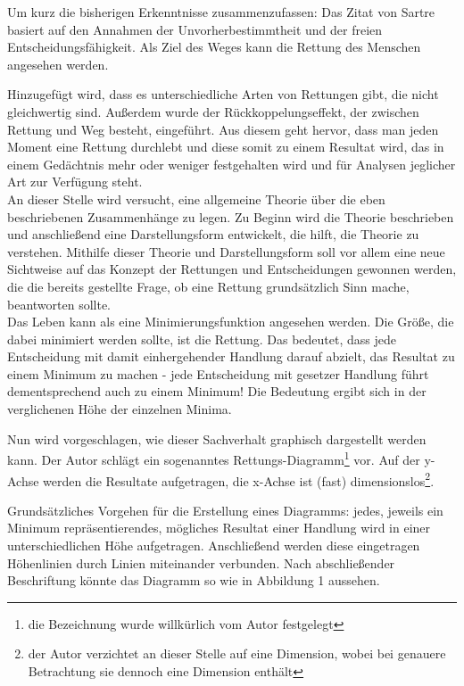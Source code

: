 \documentclass[12pt,a4paper,oneside]{article}
\begin{document}
  Um kurz die bisherigen Erkenntnisse zusammenzufassen: Das Zitat von Sartre basiert auf den Annahmen der Unvorherbestimmtheit und der freien Entscheidungsfähigkeit. Als Ziel des Weges kann die Rettung des Menschen angesehen werden. 
  
  Hinzugefügt wird, dass es unterschiedliche Arten von Rettungen gibt, die nicht gleichwertig sind. Außerdem wurde der Rückkoppelungseffekt, der zwischen Rettung und Weg besteht, eingeführt. Aus diesem geht hervor, dass man jeden Moment eine Rettung durchlebt und diese somit zu einem Resultat wird, das in einem Gedächtnis mehr oder weniger festgehalten wird und für Analysen jeglicher Art zur Verfügung steht. \\
  
  An dieser Stelle wird versucht, eine allgemeine Theorie über die eben beschriebenen Zusammenhänge zu legen. Zu Beginn wird die Theorie beschrieben und anschließend eine Darstellungsform entwickelt, die hilft, die Theorie zu verstehen. Mithilfe dieser Theorie und Darstellungsform soll vor allem eine neue Sichtweise auf das Konzept der Rettungen und Entscheidungen gewonnen werden, die die bereits gestellte Frage, ob eine Rettung grundsätzlich Sinn mache, beantworten sollte. \\
  
  Das Leben kann als eine Minimierungsfunktion angesehen werden. Die Größe, die dabei minimiert werden sollte, ist die Rettung. Das bedeutet, dass jede Entscheidung mit damit einhergehender Handlung darauf abzielt, das Resultat zu einem Minimum zu machen - jede Entscheidung mit gesetzer Handlung führt dementsprechend auch zu einem Minimum! Die Bedeutung ergibt sich in der verglichenen Höhe der einzelnen Minima. 
  
  Nun wird vorgeschlagen, wie dieser Sachverhalt graphisch dargestellt werden kann. Der Autor schlägt ein sogenanntes Rettungs-Diagramm\footnote{die Bezeichnung wurde willkürlich vom Autor festgelegt} vor. Auf der y-Achse werden die Resultate aufgetragen, die x-Achse ist (fast) dimensionslos\footnote{der Autor verzichtet an dieser Stelle auf eine Dimension, wobei bei genauere Betrachtung sie dennoch eine Dimension enthält}.
  
  Grundsätzliches Vorgehen für die Erstellung eines Diagramms: jedes, jeweils ein Minimum repräsentierendes, mögliches Resultat einer Handlung wird in einer unterschiedlichen Höhe aufgetragen. Anschließend werden diese eingetragen Höhenlinien durch Linien miteinander verbunden. Nach abschließender Beschriftung könnte das Diagramm so wie in Abbildung 1 aussehen. \\
  
\end{document}
